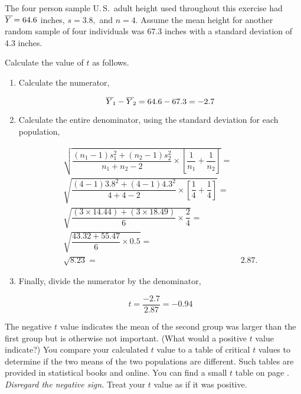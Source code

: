 \documentclass[12pt]{exam}
\newcommand*\meanY{\overline{Y\kern1.67pt}\kern-1.67pt}
\begin{document}
\begin{questions}
The four person sample U.\,S.\ adult height used throughout this exercise had $\meanY = 64.6$ inches, $s = 3.8,$ and $n = 4.$ Assume the mean height for another random sample of four individuals was 67.3 inches with a standard deviation of 4.3 inches.

Calculate the value of $t$ as follows.

\begin{enumerate}

\item Calculate the numerator,

\begin{equation*}
\meanY_1 - \meanY_2 = 64.6 - 67.3 = -2.7
\end{equation*}

\item Calculate the entire denominator, using the standard deviation for each population,

\begin{equation*}
	\begin{split}
		\sqrt{\dfrac{\left(n_1 - 1\right)s_1^2 + \left(n_2 - 1\right)s_2^2}{n_1 + n_2 -2} \times \left[\dfrac{1}{n_1} + \dfrac{1}{n_2}\right]} = & \\
%
		\sqrt{\dfrac{\left(4 - 1\right)3.8^2 + \left(4 - 1\right)4.3^2}{4 + 4 - 2} \times \left[\dfrac{1}{4} + \dfrac{1}{4}\right]} = & \\
%
		\sqrt{\dfrac{\left(3 \times 14.44\right) + \left(3 \times18.49 \right)}{6} \times \dfrac{2}{4}} = & \\
%
		\sqrt{\dfrac{43.32 + 55.47}{6} \times 0.5} = & \\
		\sqrt{8.23} = &\ 2.87.
	\end{split}
\end{equation*}

\item Finally, divide the numerator by the denominator,

\begin{equation*}
	t = \frac{-2.7}{2.87} = -0.94
\end{equation*}

\end{enumerate}


The negative $t$ value indicates the mean of the second group was larger than the first group but is otherwise not important. (What would a positive $t$ value indicate?) You compare your calculated $t$ value to a table of critical $t$ values to determine if the two means of the two populations are different. Such tables are provided in statistical books and online. You can find a small $t$ table on page \pageref{tab:ttable}. \emph{Disregard the negative sign.} Treat your $t$ value as if it was positive. 


\end{questions}
\end{document}
